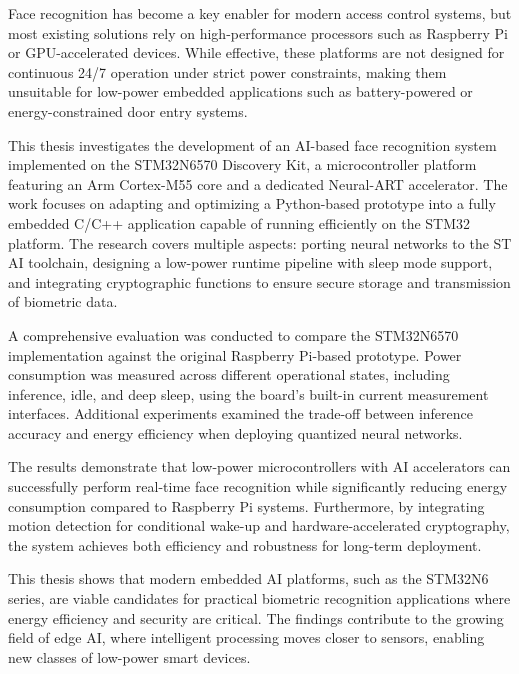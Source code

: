%
%

Face recognition has become a key enabler for modern access control systems, but most existing solutions rely on high-performance processors such as Raspberry Pi or GPU-accelerated devices. While effective, these platforms are not designed for continuous 24/7 operation under strict power constraints, making them unsuitable for low-power embedded applications such as battery-powered or energy-constrained door entry systems.  

This thesis investigates the development of an AI-based face recognition system implemented on the STM32N6570 Discovery Kit, a microcontroller platform featuring an Arm Cortex-M55 core and a dedicated Neural-ART accelerator. The work focuses on adapting and optimizing a Python-based prototype into a fully embedded C/C++ application capable of running efficiently on the STM32 platform. The research covers multiple aspects: porting neural networks to the ST AI toolchain, designing a low-power runtime pipeline with sleep mode support, and integrating cryptographic functions to ensure secure storage and transmission of biometric data.  

A comprehensive evaluation was conducted to compare the STM32N6570 implementation against the original Raspberry Pi-based prototype. Power consumption was measured across different operational states, including inference, idle, and deep sleep, using the board’s built-in current measurement interfaces. Additional experiments examined the trade-off between inference accuracy and energy efficiency when deploying quantized neural networks.  

The results demonstrate that low-power microcontrollers with AI accelerators can successfully perform real-time face recognition while significantly reducing energy consumption compared to Raspberry Pi systems. Furthermore, by integrating motion detection for conditional wake-up and hardware-accelerated cryptography, the system achieves both efficiency and robustness for long-term deployment.  

This thesis shows that modern embedded AI platforms, such as the STM32N6 series, are viable candidates for practical biometric recognition applications where energy efficiency and security are critical. The findings contribute to the growing field of edge AI, where intelligent processing moves closer to sensors, enabling new classes of low-power smart devices.  
